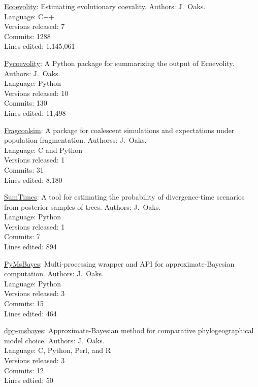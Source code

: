 \myHangIndent
\href{https://github.com/phyletica/ecoevolity}{Ecoevolity}:
    Estimating evolutionary coevality.
    Authors: J.\ Oaks. \\
    Language: C++ \\
    Versions released: 7 \\
    Commits: 1288 \\
    Lines edited: 1,145,061

\myHangIndent
\href{https://github.com/phyletica/sumcoevolity}{Pycoevolity}:
    A Python package for summarizing the output of Ecoevolity.
    Authors: J.\ Oaks. \\
    Language: Python \\
    Versions released: 10 \\
    Commits: 130 \\
    Lines edited: 11,498

\myHangIndent
\href{https://github.com/joaks1/fragcoalsim}{Fragcoalsim}:
    A package for coalescent simulations and expectations under population
    fragmentation.
    Authorss: J.\ Oaks. \\
    Language: C and Python \\
    Versions released: 1 \\
    Commits: 31 \\
    Lines edited: 8,180

\myHangIndent
\href{https://github.com/phyletica/SumTimes}{SumTimes}:
    A tool for estimating the probability of divergence-time scenarios from
    posterior samples of trees.
    Authors: J.\ Oaks. \\
    Language: Python \\
    Versions released: 1 \\
    Commits: 7 \\
    Lines edited: 894

\myHangIndent
\href{https://github.com/joaks1/PyMsBayes}{PyMsBayes}:
    Multi-processing wrapper and API for approximate-Bayesian
    computation.
    Authors: J.\ Oaks. \\
    Language: Python \\
    Versions released: 3 \\
    Commits: 15 \\
    Lines edited: 464

\myHangIndent
\href{https://github.com/joaks1/dpp-msbayes}{dpp-msbayes}:
    Approximate-Bayesian method for comparative phylogeographical model choice.
    Authors: J.\ Oaks. \\
    Language: C, Python, Perl, and R \\
    Versions released: 3 \\
    Commits: 12 \\
    Lines edtied: 50

